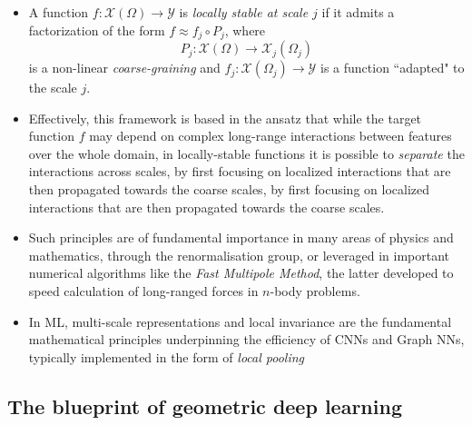\documentclass[12pt]{article}
\numberwithin{equation}{section}
\theoremstyle{definition}
\newcommand{		\1		}	{	\bm{1}					}%
\begin{document}
\begin{itemize}

\item A function $f : \mathcal{X} (\Omega) \to \mathcal{Y}$ is \emph{locally stable at scale $j$} if it admits a factorization of the form $f \approx f_j \circ P_j$, where 
    $$
    P_j : \mathcal{X}(\Omega) \to \mathcal{X}_j (\Omega_j) 
    $$
    is a non-linear \emph{coarse-graining} and $f_j : \mathcal{X}(\Omega_j) \to \mathcal{Y}$ is a function ``adapted" to the scale $j$. 
    
\item Effectively, this framework is based in the ansatz that while the target function $f$ may depend on complex long-range interactions between features over the whole domain, in locally-stable functions it is possible to \emph{separate} the interactions across scales, by first focusing on localized interactions that are then propagated towards the coarse scales, by first focusing on localized interactions that are then propagated towards the coarse scales.

\item Such principles are of fundamental importance in many areas of physics and mathematics, through the renormalisation group, or leveraged in important numerical algorithms like the \emph{Fast Multipole Method}, the latter developed to speed calculation of long-ranged forces in $n$-body problems. 

\item In ML, multi-scale representations and local invariance are the fundamental mathematical principles underpinning the efficiency of CNNs and Graph NNs, typically implemented in the form of \emph{local pooling}

\end{itemize}

\subsection{The blueprint of geometric deep learning}
\end{document}
